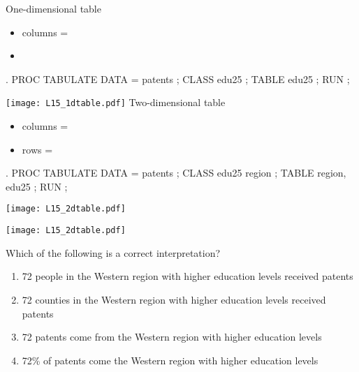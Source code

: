\begin{frame}[fragile]
\hspace*{-0.3in}
One-dimensional table
\begin{itemize}
\item columns = 
\item[]
\end{itemize}
\begin{code}{.}
PROC TABULATE DATA = patents ;
   CLASS edu25 ;
   TABLE edu25 ;
RUN ;
\end{code}
\texttt{[image: L15\_1dtable.pdf]}
\emp
\blankcolumn
{}
Two-dimensional table
\begin{itemize}
\item columns = 
\item rows = 
\end{itemize}
\begin{code}{.}
PROC TABULATE DATA = patents ;
   CLASS edu25 region ;
   TABLE region, edu25 ;
RUN ;
\end{code}
\texttt{[image: L15\_2dtable.pdf]}
\emp
\end{frame}

\begin{frame}
\texttt{[image: L15\_2dtable.pdf]}
\emp
\blankcolumn
{}
\begin{clicker}{Which of the following is a correct interpretation?}
\begin{enumerate}
\item 72 people in the Western region with higher education levels received patents
\item 72 counties in the Western region with higher education levels received patents
\item 72 patents come from the Western region with higher education levels
\item 72\% of patents come the Western region with higher education levels
\end{enumerate}
\end{clicker}
\emp
\end{frame}


